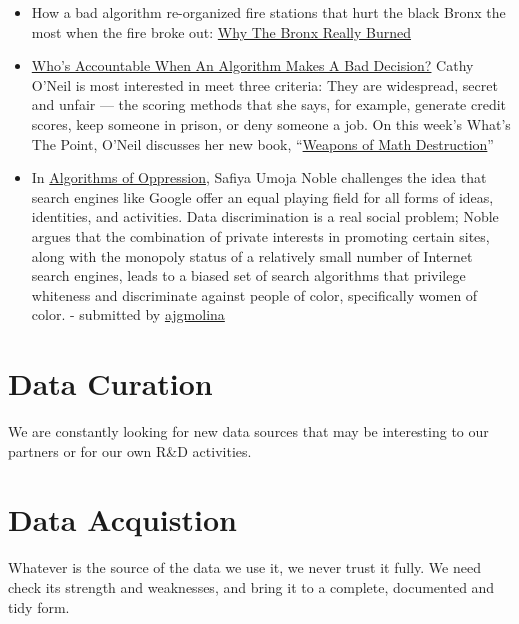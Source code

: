\documentclass[
  fontsize=13pt,
  english,
  a4paper,
  openany, a4paper, oneside]{article}
\begin{document}
\begin{itemize}
\item
  How a bad algorithm re-organized fire stations that hurt the black Bronx the most when the fire broke out: \href{https://fivethirtyeight.com/features/why-the-bronx-really-burned/}{Why The Bronx Really Burned}
\item
  \href{https://fivethirtyeight.com/features/whos-accountable-when-an-algorithm-makes-a-bad-decision/}{Who's Accountable When An Algorithm Makes A Bad Decision?} Cathy O'Neil is most interested in meet three criteria: They are widespread, secret and unfair --- the scoring methods that she says, for example, generate credit scores, keep someone in prison, or deny someone a job. On this week's What's The Point, O'Neil discusses her new book, ``\href{https://weaponsofmathdestructionbook.com/}{Weapons of Math Destruction}''
\item
  In \href{https://nyupress.org/9781479837243/algorithms-of-oppression/}{Algorithms of Oppression}, Safiya Umoja Noble challenges the idea that search engines like Google offer an equal playing field for all forms of ideas, identities, and activities. Data discrimination is a real social problem; Noble argues that the combination of private interests in promoting certain sites, along with the monopoly status of a relatively small number of Internet search engines, leads to a biased set of search algorithms that privilege whiteness and discriminate against people of color, specifically women of color. - submitted by \href{https://keybase.io/ajgmolina}{ajgmolina}
\end{itemize}

\hypertarget{data-curation}{%
\section{Data Curation}\label{data-curation}}

We are constantly looking for new data sources that may be interesting to our partners or for our own R\&D activities.

\hypertarget{acquisition}{%
\section{Data Acquistion}\label{acquisition}}

Whatever is the source of the data we use it, we never trust it fully. We need check its strength and weaknesses, and bring it to a complete, documented and tidy form.
\end{document}
